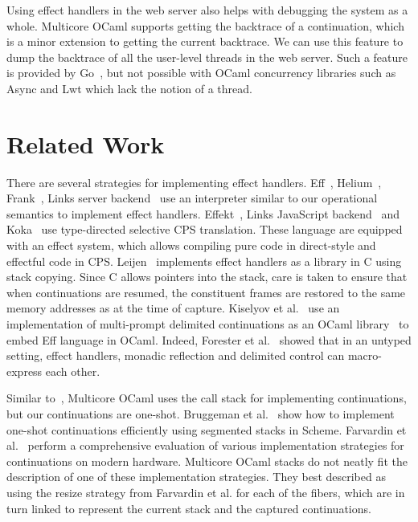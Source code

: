 \documentclass[sigplan,10pt,review,anonymous]{acmart}\settopmatter{printfolios=true,printccs=false,printacmref=false}
\begin{document}
Using effect handlers in the web server also helps with debugging the system as
a whole. Multicore OCaml supports getting the backtrace of a continuation,
which is a minor extension to getting the current backtrace. We can use this
feature to dump the backtrace of all the user-level threads in the web server.
Such a feature is provided by Go~\cite{gopprof}, but not possible with OCaml
concurrency libraries such as Async and Lwt which lack the notion of a thread.

\vspace{-3.5mm}
\section{Related Work}
\label{sec:related}

There are several strategies for implementing effect handlers. Eff~\cite{Eff},
Helium~\cite{Biernacki20}, Frank~\cite{Frank}, Links server
backend~\cite{Hillerstrom20} use an interpreter similar to our operational
semantics to implement effect handlers. Effekt~\cite{Effekt}, Links JavaScript
backend~\cite{Hillerstrom20} and Koka~\cite{Leijen17} use type-directed
selective CPS translation. These language are equipped with an effect system,
which allows compiling pure code in direct-style and effectful code in CPS.
Leijen~\cite{Leijen14} implements effect handlers as a library in C using stack
copying. Since C allows pointers into the stack, care is taken to ensure that
when continuations are resumed, the constituent frames are restored to the same
memory addresses as at the time of capture. Kiselyov et al.~\cite{Kiselyov18}
use an implementation of multi-prompt delimited continuations as an OCaml
library~\cite{Kiselyov12} to embed Eff language in OCaml. Indeed, Forester et
al.~\cite{Forster19} showed that in an untyped setting, effect handlers,
monadic reflection and delimited control can macro-express each other.

Similar to~\cite{Leijen14, Kiselyov12}, Multicore OCaml uses the call stack for
implementing continuations, but our continuations are one-shot. Bruggeman et
al.~\cite{Bruggeman96} show how to implement one-shot continuations efficiently
using segmented stacks in Scheme. Farvardin et al.~\cite{Farvardin20} perform a
comprehensive evaluation of various implementation strategies for continuations
on modern hardware. Multicore OCaml stacks do not neatly fit the description of
one of these implementation strategies. They best described as using the resize
strategy from Farvardin et al. for each of the fibers, which are in turn linked
to represent the current stack and the captured continuations.
\end{document}
